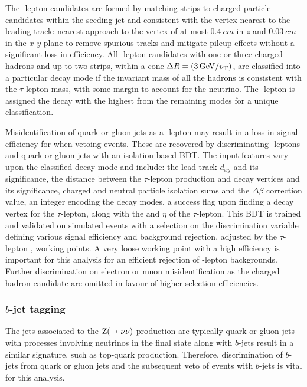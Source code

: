 The \Ptauh-lepton candidates are formed by matching strips to charged particle candidates within the seeding jet and consistent with the vertex nearest to the leading track: nearest approach to the vertex of at most $\SI{0.4}{cm}$ in $z$ and $\SI{0.03}{cm}$ in the $x$-$y$ plane to remove spurious tracks and mitigate pileup effects without a significant loss in efficiency. All \Ptauh-lepton candidates with one or three charged hadrons and up to two strips, within a cone $\Delta R=(\SI{3}{GeV}/p_{\text{T}})$, are classified into a particular decay mode if the invariant mass of all the hadrons is consistent with the $\tau$-lepton mass, with some margin to account for the neutrino. The \Ptauh-lepton is assigned the decay with the highest \pt from the remaining modes for a unique classification.

Misidentification of quark or gluon jets as a \Ptauh-lepton may result in a loss in signal efficiency for \IZvvj when vetoing \Ptauh events. These are recovered by discriminating \Ptauh-leptons and quark or gluon jets with an isolation-based BDT. The input features vary upon the classified decay mode and include: the lead track $d_{xy}$ and its significance, the distance between the $\tau$-lepton production and decay vertices and its significance, charged and neutral particle isolation sums and the $\Delta\beta$ correction value, an integer encoding the decay modes, a success flag upon finding a decay vertex for the $\tau$-lepton, along with the \pt and $\eta$ of the $\tau$-lepton. This BDT is trained and validated on simulated events with a selection on the discrimination variable defining various signal efficiency and background rejection, adjusted by the $\tau$-lepton \pt, working points. A very loose working point with a high efficiency is important for this analysis for an efficient rejection of \Ptauh-lepton backgrounds. Further discrimination on electron or muon misidentification as the charged hadron candidate are omitted in favour of higher selection efficiencies.

\subsubsection{$b$-jet tagging}

The jets associated to the ${\mathrm{Z}(\rightarrow\nu\bar{\nu})}$ production are typically quark or gluon jets with processes involving neutrinos in the final state along with $b$-jets result in a similar signature, such as top-quark production. Therefore, discrimination of $b$-jets from quark or gluon jets and the subsequent veto of events with $b$-jets is vital for this analysis.

